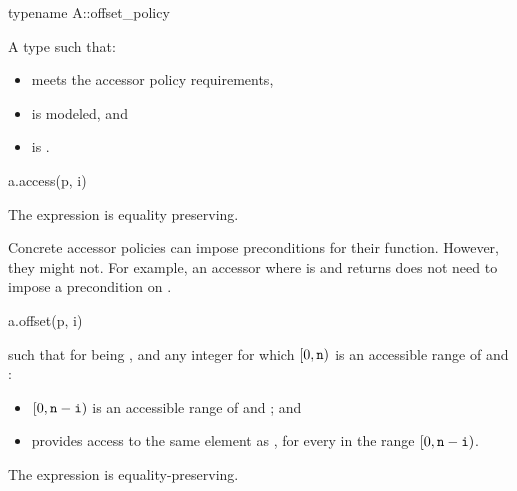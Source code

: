 \begin{itemdecl}
typename A::offset_policy
\end{itemdecl}

\begin{itemdescr}
\pnum
\result
A type  such that:

\begin{itemize}
\item
{} meets the accessor policy requirements,
\item
{} is modeled, and
\item
{} is .
\end{itemize}
\end{itemdescr}

\begin{itemdecl}
a.access(p, i)
\end{itemdecl}

\begin{itemdescr}
\pnum
\result
{}

\pnum
\remarks
The expression is equality preserving.

\pnum
\begin{note}
Concrete accessor policies can impose preconditions for their  function.
However, they might not.
For example, an accessor where
 is  and
 returns 
does not need to impose a precondition on .
\end{note}
\end{itemdescr}

\begin{itemdecl}
a.offset(p, i)
\end{itemdecl}

\begin{itemdescr}
\pnum
\result
{}

\pnum
\returns
{} such that for  being , and
any integer  for which $[0, \texttt{n})$ is
an accessible range of  and :
\begin{itemize}
\item
$[0, \texttt{n} - \texttt{i})$ is an accessible range of  and ; and
\item
{} provides access to
the same element as ,
for every  in the range $[0, \texttt{n} - \texttt{i})$.
\end{itemize}

\pnum
\remarks
The expression is equality-preserving.
\end{itemdescr}

